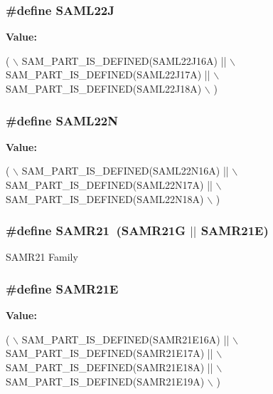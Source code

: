 \subsubsection[{S\+A\+M\+L22\+J}]{\setlength{\rightskip}{0pt plus 5cm}\#define S\+A\+M\+L22\+J}\label{group__sam__part__macros__group_ga88e5b2e7925ad798e0e6d099be6ac52d}
{\bfseries Value\+:}
\begin{DoxyCode}
( \(\backslash\)
        SAM\_PART\_IS\_DEFINED(SAML22J16A) || \(\backslash\)
        SAM\_PART\_IS\_DEFINED(SAML22J17A) || \(\backslash\)
        SAM\_PART\_IS\_DEFINED(SAML22J18A) \(\backslash\)
    )
\end{DoxyCode}
\hypertarget{group__sam__part__macros__group_gacacfa44cd4e08d409f47b21091d37d7b}{}
\subsubsection[{S\+A\+M\+L22\+N}]{\setlength{\rightskip}{0pt plus 5cm}\#define S\+A\+M\+L22\+N}\label{group__sam__part__macros__group_gacacfa44cd4e08d409f47b21091d37d7b}
{\bfseries Value\+:}
\begin{DoxyCode}
( \(\backslash\)
        SAM\_PART\_IS\_DEFINED(SAML22N16A) || \(\backslash\)
        SAM\_PART\_IS\_DEFINED(SAML22N17A) || \(\backslash\)
        SAM\_PART\_IS\_DEFINED(SAML22N18A) \(\backslash\)
    )
\end{DoxyCode}
\hypertarget{group__sam__part__macros__group_ga63b66a40b044f5f10d6dfa3ff51a0acb}{}
\subsubsection[{S\+A\+M\+R21}]{\setlength{\rightskip}{0pt plus 5cm}\#define S\+A\+M\+R21~(S\+A\+M\+R21\+G $\vert$$\vert$ S\+A\+M\+R21\+E)}\label{group__sam__part__macros__group_ga63b66a40b044f5f10d6dfa3ff51a0acb}
S\+A\+M\+R21 Family \hypertarget{group__sam__part__macros__group_ga29500011ca9cccd91d5131b74ba45ece}{}
\subsubsection[{S\+A\+M\+R21\+E}]{\setlength{\rightskip}{0pt plus 5cm}\#define S\+A\+M\+R21\+E}\label{group__sam__part__macros__group_ga29500011ca9cccd91d5131b74ba45ece}
{\bfseries Value\+:}
\begin{DoxyCode}
( \(\backslash\)
        SAM\_PART\_IS\_DEFINED(SAMR21E16A) || \(\backslash\)
        SAM\_PART\_IS\_DEFINED(SAMR21E17A) || \(\backslash\)
        SAM\_PART\_IS\_DEFINED(SAMR21E18A) || \(\backslash\)
        SAM\_PART\_IS\_DEFINED(SAMR21E19A) \(\backslash\)
    )
\end{DoxyCode}
\hypertarget{group__sam__part__macros__group_gad414d7dfda114b1381015378bb6a5665}{}
